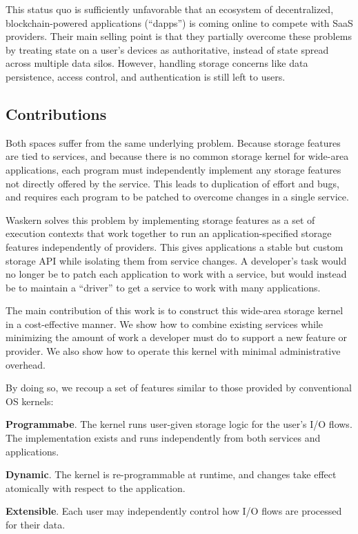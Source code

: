 This status quo is sufficiently unfavorable that an ecosystem of decentralized,
blockchain-powered applications (``dapps'') is coming online to compete with SaaS
providers. Their main selling point is that they partially overcome these
problems by treating state on a user's devices as authoritative, instead of
state spread across multiple data silos. However, handling storage concerns
like data persistence, access control, and authentication is still left to
users.

\subsection{Contributions}

Both spaces suffer from the same underlying problem. Because storage features
are tied to services, and because there is no common storage kernel for
wide-area applications, each program must independently implement any storage
features not directly offered by the service.  This leads to duplication of
effort and bugs, and requires each program to be patched to overcome changes in
a single service.

Waskern solves this problem by implementing
storage features as a set of execution contexts that work together to run an 
application-specified storage features independently of providers.  This gives
applications a stable but
custom storage API while isolating them from service changes.  A
developer's task would no longer be to patch each application to work with a
service, but would instead be to maintain a ``driver'' to get a service to
work with many applications.

The main contribution of this work is to construct this
wide-area storage kernel in a cost-effective manner.  We show how to
combine existing services while minimizing the amount of work
a developer must do to support a new feature or provider.  We also show
how to operate this kernel with minimal administrative overhead.

By doing so, we recoup a set of features similar to those provided by
conventional OS kernels:

\textbf{Programmabe}. The kernel runs user-given storage logic for the user's
I/O flows.  The implementation exists and runs independently from both
services and applications.

\textbf{Dynamic}. The kernel is re-programmable at
runtime, and changes take effect atomically with respect to the application.

\textbf{Extensible}.  Each user may independently control how I/O flows are
processed for their data.

